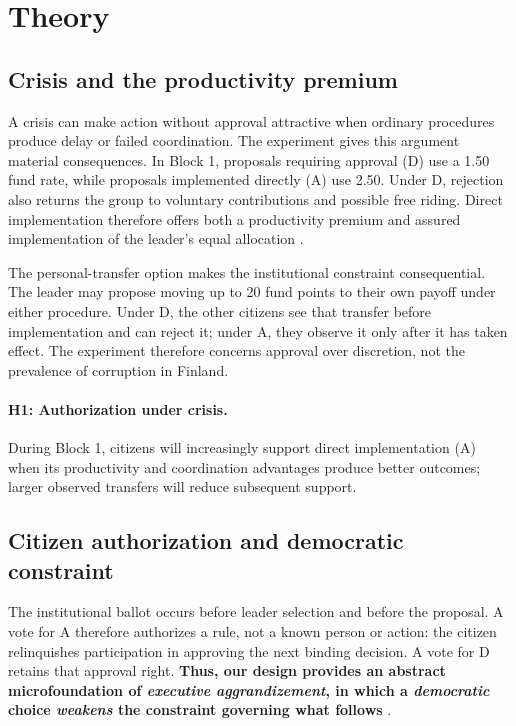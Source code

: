 \documentclass[11pt,a4paper]{article}
\newcommand{\Dproc}{\textsf{D}}
\newcommand{\Aproc}{\textsf{A}}
\begin{document}
\section{Theory}

\subsection{Crisis and the productivity premium}

A crisis can make action without approval attractive when ordinary procedures produce delay or failed coordination. The experiment gives this argument material consequences. In Block 1, proposals requiring approval (\Dproc) use a 1.50 fund rate, while proposals implemented directly (\Aproc) use 2.50. Under \Dproc{}, rejection also returns the group to voluntary contributions and possible free riding. Direct implementation therefore offers both a productivity premium and assured implementation of the leader's equal allocation \parencites{FehrGachter2000,FischbacherGachter2010,Hamman2011}.

The personal-transfer option makes the institutional constraint consequential. The leader may propose moving up to 20 fund points to their own payoff under either procedure. Under \Dproc{}, the other citizens see that transfer before implementation and can reject it; under \Aproc{}, they observe it only after it has taken effect. The experiment therefore concerns approval over discretion, not the prevalence of corruption in Finland.

\paragraph{H1: Authorization under crisis.} During Block 1, citizens will increasingly support direct implementation (\Aproc{}) when its productivity and coordination advantages produce better outcomes; larger observed transfers will reduce subsequent support.

\subsection{Citizen authorization and democratic constraint}

The institutional ballot occurs before leader selection and before the proposal. A vote for \Aproc{} therefore authorizes a rule, not a known person or action: the citizen relinquishes participation in approving the next binding decision. A vote for \Dproc{} retains that approval right. {\bf Thus, our design provides an abstract microfoundation of \emph{executive aggrandizement}, in which a \emph{democratic} choice \emph{weakens} the constraint governing what follows} \parencites{Bermeo2016,FortezaMussioPereyra2024}.
\end{document}
